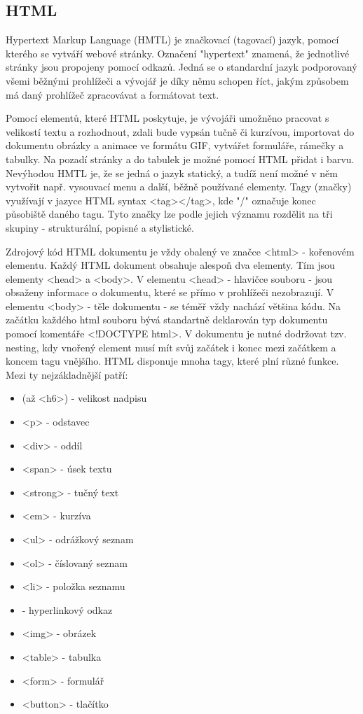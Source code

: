\subsection{HTML}
Hypertext Markup Language (HMTL) je značkovací (tagovací) jazyk, pomocí kterého se vytváří webové stránky. Označení "hypertext" znamená, že jednotlivé stránky jsou propojeny pomocí odkazů. Jedná se o standardní jazyk podporovaný všemi běžnými prohlížeči a vývojář je díky němu schopen říct, jakým způsobem má daný prohlížeč zpracovávat a formátovat text.

Pomocí elementů, které HTML poskytuje, je vývojáři umožněno pracovat s velikostí textu a rozhodnout, zdali bude vypsán tučně či kurzívou, importovat do dokumentu obrázky a animace ve formátu GIF, vytvářet formuláře, rámečky a tabulky. Na pozadí stránky a do tabulek je možné pomocí HTML přidat i barvu. Nevýhodou HMTL je, že se jedná o jazyk statický, a tudíž není možné v něm vytvořit např. vysouvací menu a další, běžně používané elementy. Tagy (značky) využívají v jazyce HTML syntax <tag></tag>, kde "/" označuje konec působiště daného tagu. Tyto značky lze podle jejich významu rozdělit na tři skupiny - strukturální, popisné a stylistické.\cite{Pisek}

Zdrojový kód HTML dokumentu je vždy obalený ve značce <html> - kořenovém elementu. Každý HTML dokument obsahuje alespoň dva elementy. Tím jsou elementy <head> a <body>. V elementu <head> - hlavičce souboru - jsou obsaženy informace o dokumentu, které se přímo v prohlížeči nezobrazují. V elementu <body> - těle dokumentu - se téměř vždy nachází většina kódu. Na začátku každého html souboru bývá standartně deklarován typ dokumentu pomocí komentáře <!DOCTYPE html>.  V dokumentu je nutné dodržovat tzv. nesting, kdy vnořený element musí mít svůj začátek i konec mezi začátkem a koncem tagu vnějšího. HTML disponuje mnoha tagy, které plní různé funkce. Mezi ty nejzákladnější patří:


\begin{itemize}
\item <h1>(až <h6>) - velikost nadpisu
\item <p> - odstavec
\item<div> - oddíl
\item<span> - úsek textu
\item<strong> - tučný text
\item<em> - kurzíva
\item<ul> - odrážkový seznam
\item<ol> - číslovaný seznam
\item<li> - položka seznamu
\item<a href> - hyperlinkový odkaz
\item<img> - obrázek
\item<table> - tabulka
\item<form> - formulář
\item<button> - tlačítko
\end{itemize}

